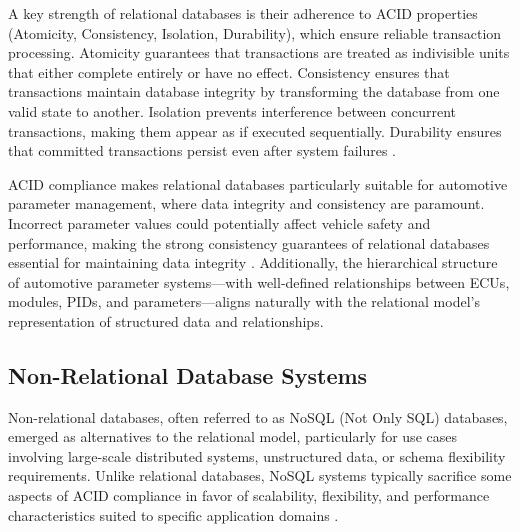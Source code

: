 A key strength of relational databases is their adherence to ACID properties (Atomicity, Consistency, Isolation, Durability), which ensure reliable transaction processing. Atomicity guarantees that transactions are treated as indivisible units that either complete entirely or have no effect. Consistency ensures that transactions maintain database integrity by transforming the database from one valid state to another. Isolation prevents interference between concurrent transactions, making them appear as if executed sequentially. Durability ensures that committed transactions persist even after system failures \cite{elmasri2015fundamentals}.

ACID compliance makes relational databases particularly suitable for automotive parameter management, where data integrity and consistency are paramount. Incorrect parameter values could potentially affect vehicle safety and performance, making the strong consistency guarantees of relational databases essential for maintaining data integrity \cite{staron2021automotive}. Additionally, the hierarchical structure of automotive parameter systems—with well-defined relationships between \acp{ECU}, modules, \acp{PID}, and parameters—aligns naturally with the relational model's representation of structured data and relationships.

\subsection{Non-Relational Database Systems}
\label{subsec:non-relational-database-systems}

Non-relational databases, often referred to as NoSQL (Not Only SQL) databases, emerged as alternatives to the relational model, particularly for use cases involving large-scale distributed systems, unstructured data, or schema flexibility requirements. Unlike relational databases, NoSQL systems typically sacrifice some aspects of ACID compliance in favor of scalability, flexibility, and performance characteristics suited to specific application domains \cite{bhattacherjee2015principles}.

